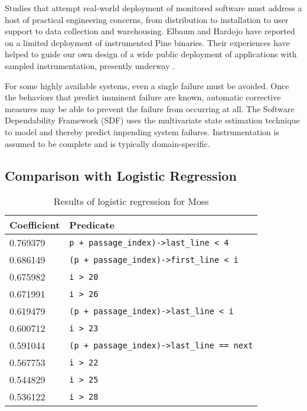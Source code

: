 \documentclass[draft]{sig-alternate}
\begin{document}
Studies that attempt real-world deployment of monitored software must
address a host of practical engineering concerns, from distribution to
installation to user support to data collection and warehousing.
Elbaum and Hardojo \cite{Elbaum:2003:DISATA} have reported on a
limited deployment of instrumented Pine binaries.  Their experiences
have helped to guide our own design of a wide public deployment of
applications with sampled instrumentation, presently underway
\cite{Liblit:2003:CBIP}.

For some highly available systems, even a single failure must be
avoided.  Once the behaviors that predict imminent failure are known,
automatic corrective measures may be able to prevent the failure from
occurring at all.  The Software Dependability Framework (SDF)
\cite{Gross:2003:PSMUST} uses the multivariate state estimation
technique to model and thereby predict impending system failures.
Instrumentation is assumed to be complete and is typically
domain-specific.


\subsection{Comparison with Logistic Regression}
\label{sec:comparison}

\begin{table}
\caption{Results of logistic regression for Moss}
\label{tab:logregression}
\centering
\small
\begin{tabular}{ll}
  \toprule
  Coefficient & Predicate \\
  \midrule
  0.769379 & \verb|p + passage_index)->last_line < 4| \\
  0.686149 & \verb|(p + passage_index)->first_line < i| \\
  0.675982 & \verb|i > 20| \\
  0.671991 & \verb|i > 26| \\
  0.619479 & \verb|(p + passage_index)->last_line < i| \\
  0.600712 & \verb|i > 23| \\
  0.591044 & \verb|(p + passage_index)->last_line == next| \\
  0.567753 & \verb|i > 22| \\
  0.544829 & \verb|i > 25| \\
  0.536122 & \verb|i > 28| \\
  \bottomrule
\end{tabular}
\end{table}
\end{document}
